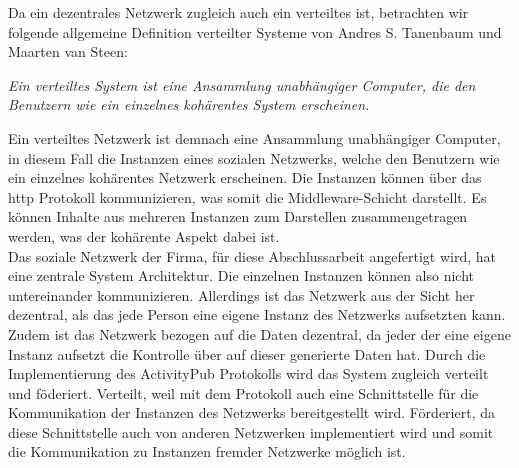 	Da ein dezentrales Netzwerk zugleich auch ein verteiltes ist, betrachten wir folgende allgemeine Definition verteilter Systeme von Andres S. Tanenbaum und Maarten van Steen:
	\begin{addmargin}[1cm]{1cm}
		\vspace{0.5cm}
		\textit{\glqq Ein verteiltes System ist eine Ansammlung unabhängiger Computer, die den Benutzern wie ein einzelnes kohärentes System erscheinen.\grqq}\cite{distributed-systems}
		\vspace{0.5cm}
	\end{addmargin}
	Ein verteiltes Netzwerk ist demnach eine Ansammlung unabhängiger Computer, in diesem Fall die Instanzen eines sozialen Netzwerks, welche den Benutzern wie ein einzelnes kohärentes Netzwerk erscheinen. Die Instanzen können über das \gls{http} Protokoll kommunizieren, was somit die Middleware-Schicht darstellt. Es können Inhalte aus mehreren Instanzen zum Darstellen zusammengetragen werden, was der kohärente Aspekt dabei ist.\\
	
	Das soziale Netzwerk der Firma, für diese Abschlussarbeit angefertigt wird, hat eine zentrale System Architektur. Die einzelnen Instanzen können also nicht untereinander kommunizieren. Allerdings ist das Netzwerk aus der Sicht her dezentral, als das jede Person eine eigene Instanz des Netzwerks aufsetzten kann. Zudem ist das Netzwerk bezogen auf die Daten dezentral, da jeder der eine eigene Instanz aufsetzt die Kontrolle über auf dieser generierte Daten hat. Durch die Implementierung des ActivityPub Protokolls wird das System zugleich verteilt und föderiert. Verteilt, weil mit dem Protokoll auch eine Schnittstelle für die Kommunikation der Instanzen des Netzwerks bereitgestellt wird. Förderiert, da diese Schnittstelle auch von anderen Netzwerken implementiert wird und somit die Kommunikation zu Instanzen fremder Netzwerke möglich ist.
